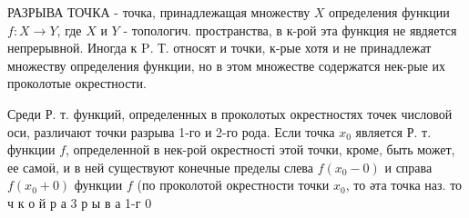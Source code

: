 \documentclass[10pt]{article}
\begin{document}
РАЗРЫВА ТОЧКА - точка, принадлежащая множеству $X$ определения функции $f: X \rightarrow Y$, где $X$ и $Y$ - топологич. пространства, в к-рой эта функция не явдяется непрерывной. Иногда к $\mathrm{P}$. Т. относят и точки, к-рые хотя и не принадлежат множеству определения функции, но в этом множестве содержатся нек-рые их проколотые окрестности.



Среди Р. т. функций, определенных в проколотых окрестностях точек числовой оси, различают точки разрыва 1-го и 2-го рода. Если точка $x_{0}$ является Р. т. функции $f$, определенной в нек-рой окрестності этой точки, кроме, быть может, ее самоӥ, и в ней существуют конечные пределы слева $f\left(x_{0}-0\right)$ и справа $f\left(x_{0}+0\right)$ функции $f$ (по проколотой окрестности точки $x_{0}$, то әта точка наз. то ч к о й р а 3 р ы в а 1-г 0
\end{document}
